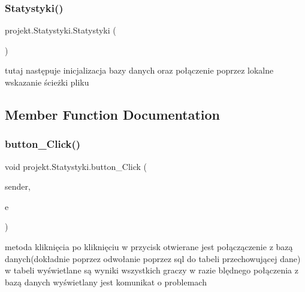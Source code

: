 \subsubsection{\texorpdfstring{Statystyki()}{Statystyki()}}
{\footnotesize\ttfamily projekt.\+Statystyki.\+Statystyki (\begin{DoxyParamCaption}{ }\end{DoxyParamCaption})\hspace{0.3cm}{\ttfamily [inline]}}



tutaj następuje inicjalizacja bazy danych oraz połączenie poprzez lokalne wskazanie ścieżki pliku 



\subsection{Member Function Documentation}
\mbox{\label{classprojekt_1_1_statystyki_ad332fb6b7fc8e823ca0f23f3bb9fdc7c}} 
\subsubsection{\texorpdfstring{button\+\_\+\+Click()}{button\_Click()}}
{\footnotesize\ttfamily void projekt.\+Statystyki.\+button\+\_\+\+Click (\begin{DoxyParamCaption}\item[{object}]{sender,  }\item[{Routed\+Event\+Args}]{e }\end{DoxyParamCaption})\hspace{0.3cm}{\ttfamily [inline]}}



metoda kliknięcia po kliknięciu w przycisk otwierane jest połączączenie z bazą danych(dokładnie poprzez odwołanie poprzez sql do tabeli przechowującej dane) w tabeli wyświetlane są wyniki wszystkich graczy w razie blędnego połączenia z bazą danych wyświetlany jest komunikat o problemach 

\mbox{\label{classprojekt_1_1_statystyki_a6f4801d8176e1c715f5260bf055b0915}} 
